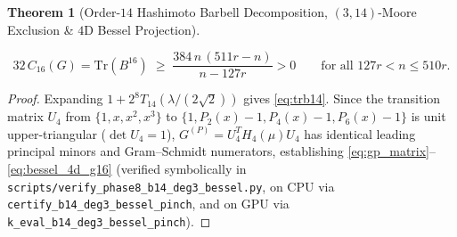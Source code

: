 \documentclass[10pt,a4paper]{article}
\newtheorem{theorem}{Theorem}[section]
\theoremstyle{definition}
\theoremstyle{remark}
\begin{document}
\begin{theorem}[Order-$14$ Hashimoto Barbell Decomposition, $(3,14)$-Moore Exclusion \& $4$D Bessel Projection]
\begin{enumerate}[label=(\alph*),nosep]
  \begin{equation}\label{eq:bessel_4d_g16}
    32\,C_{16}(G) = \mathrm{Tr}(B^{16}) \;\ge\; \frac{384\,n\,(511r - n)}{n - 127r} > 0 \qquad \text{for all } 127r < n \le 510r.
  \end{equation}
\end{enumerate}
\end{theorem}

\begin{proof}
Expanding $1 + 2^8 T_{14}(\lambda/(2\sqrt{2}))$ gives \eqref{eq:trb14}. Since the transition matrix $U_4$ from $\{1, x, x^2, x^3\}$ to $\{1, P_2(x)-1, P_4(x)-1, P_6(x)-1\}$ is unit upper-triangular ($\det U_4 = 1$), $G^{(P)} = U_4^T H_4(\mu) U_4$ has identical leading principal minors and Gram--Schmidt numerators, establishing \eqref{eq:gp_matrix}--\eqref{eq:bessel_4d_g16} (verified symbolically in \texttt{scripts/verify\_phase8\_b14\_deg3\_bessel.py}, on CPU via \texttt{certify\_b14\_deg3\_bessel\_pinch}, and on GPU via \texttt{k\_eval\_b14\_deg3\_bessel\_pinch}).
\end{proof}
\end{document}
